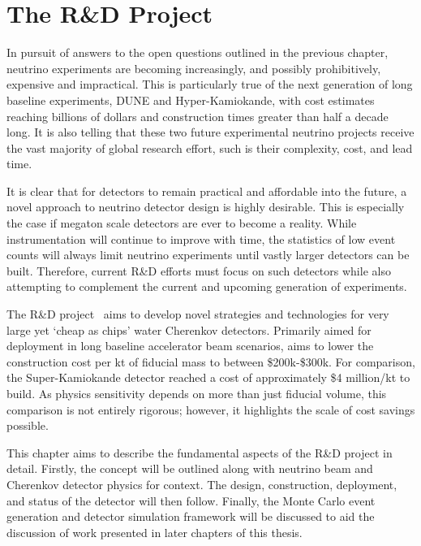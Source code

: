 \chapter{The \chips R\&D Project} %
\label{chap:chips}

In pursuit of answers to the open questions outlined in the previous chapter, neutrino experiments
are becoming increasingly, and possibly prohibitively, expensive and impractical. This is
particularly true of the next generation of long baseline experiments, DUNE and Hyper-Kamiokande,
with cost estimates reaching billions of dollars and construction times greater than half a decade
long. It is also telling that these two future experimental neutrino projects receive the vast
majority of global research effort, such is their complexity, cost, and lead time.

It is clear that for detectors to remain practical and affordable into the future, a novel
approach to neutrino detector design is highly desirable. This is especially the case if megaton
scale detectors are ever to become a reality. While instrumentation will continue to improve with
time, the statistics of low event counts will always limit neutrino experiments until vastly
larger detectors can be built. Therefore, current R\&D efforts must focus on such detectors while
also attempting to complement the current and upcoming generation of experiments.

The \chips R\&D project~\cite{adamson2013} aims to develop novel strategies and technologies for
very large yet `cheap as chips' water Cherenkov detectors. Primarily aimed for deployment in long
baseline accelerator beam scenarios, \chips aims to lower the construction cost per kt of fiducial
mass to between \$200k-\$300k. For comparison, the Super-Kamiokande detector reached a cost of
approximately \$4 million/kt to build. As physics sensitivity depends on more than just fiducial
volume, this comparison is not entirely rigorous; however, it highlights the scale of cost savings
possible.

This chapter aims to describe the fundamental aspects of the \chips R\&D project in detail.
Firstly, the \chips concept will be outlined along with neutrino beam and Cherenkov detector
physics for context. The design, construction, deployment, and status of the \chipsfive detector
will then follow. Finally, the Monte Carlo event generation and detector simulation framework will
be discussed to aid the discussion of work presented in later chapters of this thesis.

